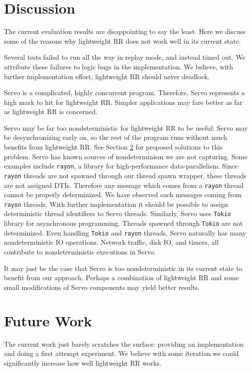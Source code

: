 \documentclass{article}
\begin{document}
\section{Discussion}
\label{sec:discussion}
The current evaluation results are disappointing to say the least. Here we discuss
some of the reasons why lightweight RR does not work well in its current state.

Several tests failed to run all the way in replay mode, and instead timed out. We attribute
these failures to logic bugs in the implementation. We believe, with further implementation
effort, lightweight RR should never deadlock.

Servo is a complicated, highly concurrent program. Therefore, Servo represents a high
mark to hit for lightweight RR. Simpler applications may fare better as far as lightweight
RR is concerned.

Servo may be far too nondeterministic
for lightweight RR to be useful: Servo may be desynchronizing early on, so the rest of
the program runs without much benefits from lightweight RR.
See Section \ref{sec:future_work} for proposed solutions to this
problem. Servo has known sources of nondeterminism we are not capturing. Some examples
include \texttt{rayon}, a library for high-performance data-parallelism. Since \texttt{rayon} threads are
not spawned through our thread spawn wrapper, these threads are not assigned DTIs. Therefore any message which comes from a \texttt{rayon} thread cannot be properly determinized.
We have observed such messages coming from \texttt{rayon} threads.
With further implementation it should be possible to assign deterministic thread
identifiers to Servo threads. Similarly, Servo uses \texttt{Tokio} library for asynchronous programming. Threads spawned through \texttt{Tokio} are not determinized.
Even handling \texttt{Tokio} and \texttt{rayon} threads, Servo naturally has many nondeterministic IO operations. Network traffic, disk IO, and timers, all contribute to nondeterministic executions in Servo.

It may just be the case that Servo is too nondeterministic in its current state to benefit
from our approach. Perhaps a combination of lightweight RR and some small modifications
of Servo components may yield better results.

\section{Future Work}
\label{sec:future_work}
The current work just barely scratches the surface: providing an implementation
and doing a first attempt experiment. We believe with some iteration we could significantly
increase how well lightweight RR works.
\end{document}
